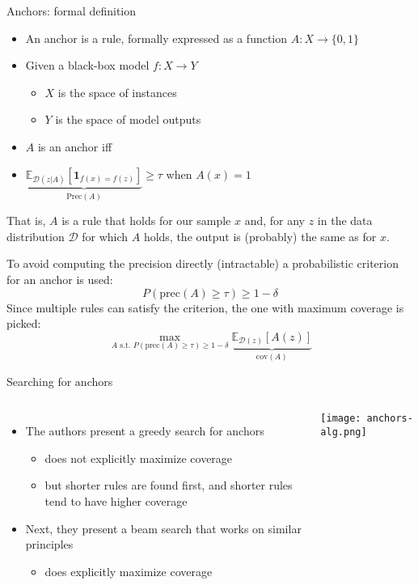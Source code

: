 \documentclass[aspectratio=169]{beamer}
\begin{document}

\begin{frame}{Anchors: formal definition}

\begin{itemize}
	\item An anchor is a rule, formally expressed as a function $A : X \rightarrow \{0,1\}$ \pause
	\item Given a black-box model $f : X \rightarrow Y$
	\begin{itemize}
		\item $X$ is the space of instances
		\item $Y$ is the space of model outputs
	\end{itemize} \pause
	\item $A$  is an anchor iff
	\item[] $\underbrace{\mathbb{E}_{\mathcal D (z | A)} \left[ \mathbf{1}_{f(x)=f(z)} \right] }_{\mathrm{Prec}(A)} \geq \tau$ when $A(x) = 1$
\end{itemize}  \pause
  That is, $A$ is a rule that holds for our sample $x$ and, for any $z$ in the data distribution $\mathcal D$ for which $A$ holds, the output is (probably) the same as for $x$. \pause
  
  To avoid computing the precision directly (intractable) a probabilistic criterion for an anchor is used:
  \[
  P( \mathrm{prec}(A) \geq \tau ) \geq 1 - \delta
  \]
  Since multiple rules can satisfy the criterion, the one with maximum coverage is picked:
  \[
  \max_{A \text{ s.t. } P(\mathrm{prec}(A) \geq \tau ) \geq 1 - \delta} \underbrace{ \mathbb E_{\mathcal D (z) } \left[ A(z) \right] }_{\mathrm{cov}(A)}
  \]
\end{frame}

\begin{frame}{Searching for anchors}
\begin{columns}
	\begin{itemize}
		\item The authors present a greedy search for anchors
		\begin{itemize}
			\item does not explicitly maximize coverage
			\item but shorter rules are found first, and shorter rules tend to have higher coverage
		\end{itemize}
		\item Next, they present a beam search that works on similar principles
		\begin{itemize}
			\item does explicitly maximize coverage
		\end{itemize}
	\end{itemize}
	
	\texttt{[image: anchors-alg.png]}
\end{columns}
\end{frame}
\end{document}
